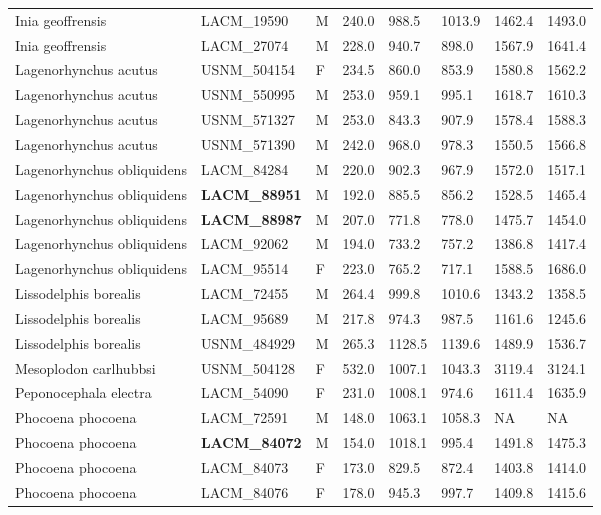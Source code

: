 \begin{longtable}{|p{1.95in}p{1.1in}p{.15in}p{.4in}p{.4in}p{.4in}p{.4in}p{.4in}|}
  Inia geoffrensis & LACM\_19590 & M & 240.0 & 988.5 & 1013.9 & 1462.4 & 1493.0 \\ 
  Inia geoffrensis & LACM\_27074 & M & 228.0 & 940.7 & 898.0 & 1567.9 & 1641.4 \\ 
  Lagenorhynchus acutus & USNM\_504154 & F & 234.5 & 860.0 & 853.9 & 1580.8 & 1562.2 \\ 
  Lagenorhynchus acutus & USNM\_550995 & M & 253.0 & 959.1 & 995.1 & 1618.7 & 1610.3 \\ 
  Lagenorhynchus acutus & USNM\_571327 & M & 253.0 & 843.3 & 907.9 & 1578.4 & 1588.3 \\ 
  Lagenorhynchus acutus & USNM\_571390 & M & 242.0 & 968.0 & 978.3 & 1550.5 & 1566.8 \\ 
  Lagenorhynchus obliquidens & LACM\_84284 & M & 220.0 & 902.3 & 967.9 & 1572.0 & 1517.1 \\ 
  Lagenorhynchus obliquidens & \textbf{ LACM\_88951 } & M & 192.0 & 885.5 & 856.2 & 1528.5 & 1465.4 \\ 
  Lagenorhynchus obliquidens & \textbf{ LACM\_88987 } & M & 207.0 & 771.8 & 778.0 & 1475.7 & 1454.0 \\ 
  Lagenorhynchus obliquidens & LACM\_92062 & M & 194.0 & 733.2 & 757.2 & 1386.8 & 1417.4 \\ 
  Lagenorhynchus obliquidens & LACM\_95514 & F & 223.0 & 765.2 & 717.1 & 1588.5 & 1686.0 \\ 
  Lissodelphis borealis & LACM\_72455 & M & 264.4 & 999.8 & 1010.6 & 1343.2 & 1358.5 \\ 
  Lissodelphis borealis & LACM\_95689 & M & 217.8 & 974.3 & 987.5 & 1161.6 & 1245.6 \\ 
  Lissodelphis borealis & USNM\_484929 & M & 265.3 & 1128.5 & 1139.6 & 1489.9 & 1536.7 \\ 
  Mesoplodon carlhubbsi & USNM\_504128 & F & 532.0 & 1007.1 & 1043.3 & 3119.4 & 3124.1 \\ 
  Peponocephala electra & LACM\_54090 & F & 231.0 & 1008.1 & 974.6 & 1611.4 & 1635.9 \\ 
  Phocoena phocoena & LACM\_72591 & M & 148.0 & 1063.1 & 1058.3 & NA & NA  \\ 
  Phocoena phocoena & \textbf{ LACM\_84072 } & M & 154.0 & 1018.1 & 995.4 & 1491.8 & 1475.3 \\ 
  Phocoena phocoena & LACM\_84073 & F & 173.0 & 829.5 & 872.4 & 1403.8 & 1414.0 \\ 
  Phocoena phocoena & LACM\_84076 & F & 178.0 & 945.3 & 997.7 & 1409.8 & 1415.6 \\ 

\end{longtable}
